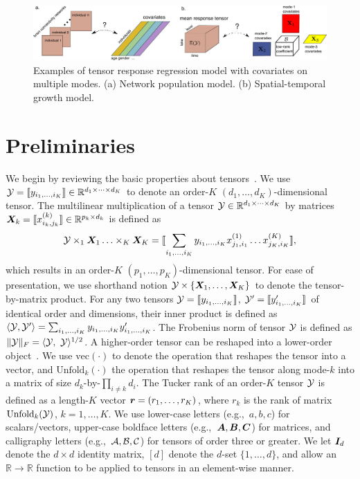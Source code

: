 \documentclass{article}
\theoremstyle{plain}
\theoremstyle{definition}
\begin{document}
\begin{figure}[t]
\begin{center}
\includegraphics[width=12cm]{demo.pdf}
\end{center}
\caption{Examples of tensor response regression model with covariates on multiple modes. (a) Network population model. (b) Spatial-temporal growth model. }\label{fig:intro1}
\vspace{-.2cm}
\end{figure}


\section{Preliminaries}
We begin by reviewing the basic properties about tensors~\cite{kolda2009tensor}. We use $\mathcal{Y}=\llbracket y_{i_1,\ldots,i_K} \rrbracket\in \mathbb{R}^{d_1\times \cdots\times d_K}$ to denote an order-$K$ $(d_1,\ldots,d_K)$-dimensional tensor. The multilinear multiplication of a tensor $\mathcal{Y}\in\mathbb{R}^{d_1\times \cdots\times d_K}$ by matrices $\bm X_k=\llbracket x_{i_k,j_k}^{(k)} \rrbracket\in\mathbb{R}^{p_k\times d_k}$ is defined as
\[
\mathcal{Y} \times_1\bm X_1\ldots \times_K \bm X_K=\llbracket \sum_{i_1,\ldots,i_K}y_{i_1,\ldots,i_K}x_{j_1,i_1}^{(1)}\ldots x_{j_K,i_K}^{(K)} \rrbracket,
\]
which results in an order-$K$ $(p_1,\ldots,p_K)$-dimensional tensor. For ease of presentation, we use shorthand notion $\mathcal{Y}\times\{\bm X_1,\ldots,\bm X_K\}$ to denote the tensor-by-matrix product. For any two tensors $\mathcal{Y}=\llbracket y_{i_1,\ldots,i_K} \rrbracket$, $\mathcal{Y}'=\llbracket y'_{i_1,\ldots,i_K} \rrbracket$ of identical order and dimensions, their inner product is defined as $\langle \mathcal{Y}, \mathcal{Y}'\rangle =\sum_{i_1,\ldots,i_K}y_{i_1,\ldots,i_K}y'_{i_1,\ldots,i_K}$. The Frobenius norm of tensor $\mathcal{Y}$ is defined as $\FnormSize{}{\tY}=\langle \tY,\ \tY \rangle^{1/2}$. A higher-order tensor can be reshaped into a lower-order object~\cite{wang2017operator}. We use $\text{vec}(\cdot)$ to denote the operation that reshapes the tensor into a vector, and $\text{Unfold}_k(\cdot)$ the operation that reshapes the tensor along mode-$k$ into a matrix of size $d_k$-by-$\prod_{i\neq k}d_i$. The Tucker rank of an order-$K$ tensor $\mathcal{Y}$ is defined as a length-$K$ vector $\bm{r}=(r_1,\ldots,r_K)$, where $r_k$ is the rank of matrix $\text{Unfold}_k(\mathcal{Y})$, $k=1,\ldots,K$. We use lower-case letters (e.g.,\ $a,b,c$) for scalars/vectors, upper-case boldface letters (e.g.,\ $\bm A,\bm B,\bm C$) for matrices, and calligraphy letters (e.g.,\ $\mathcal{A}, \mathcal{B}, \mathcal{C}$) for tensors of order three or greater. We let $\bm I_d$ denote the $d \times d$ identity matrix, $[d]$ denote the $d$-set $\{1,\ldots,d\}$, and allow an $\mathbb{R}\to \mathbb{R}$ function to be applied to tensors in an element-wise manner. 
\end{document}
